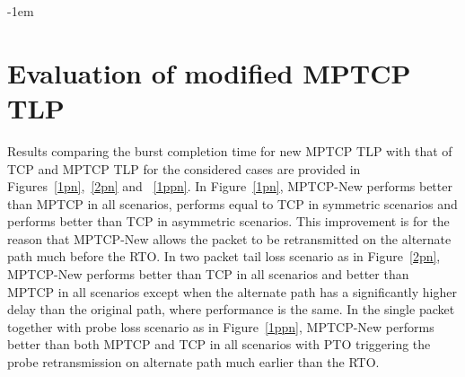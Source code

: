 \documentclass[10pt,conference,compsoc]{IEEEtran}
\begin{document}
\kern-1em
\section{Evaluation of modified MPTCP TLP}\label{eval}


Results comparing the burst completion time for new MPTCP TLP with that of TCP and MPTCP TLP for the considered cases are provided in Figures~\ref{1pn},~\ref{2pn} and ~\ref{1ppn}. In Figure~\ref{1pn}, MPTCP-New performs better than MPTCP in all scenarios, performs equal to TCP in symmetric scenarios and performs better than TCP in asymmetric scenarios. This improvement is for the reason that MPTCP-New allows the packet to be retransmitted on the alternate path much before the RTO. In two packet tail loss scenario as in Figure~\ref{2pn}, MPTCP-New performs better than TCP in all scenarios and better than MPTCP in all scenarios except when the alternate path has a significantly higher delay than the original path, where performance is the same. In the single packet together with probe loss scenario as in Figure~\ref{1ppn}, MPTCP-New performs better than both MPTCP and TCP in all scenarios with PTO triggering the probe retransmission on alternate path much earlier than the RTO.
\end{document}
